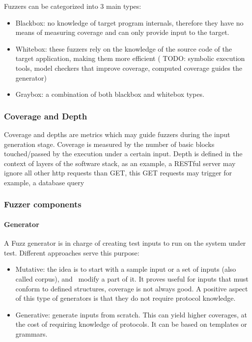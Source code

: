 Fuzzers can be categorized into 3 main types\cite{fetzer20}:

\begin{itemize}
    \item Blackbox: no knowledge of target program internals, therefore they have no means of measuring coverage and can only provide input to the target.
    \item Whitebox: these fuzzers rely on the knowledge of the source code of the target application, making them more efficient ( TODO: symbolic execution tools, model checkers that improve coverage, computed coverage guides the generator)
    \item Graybox: a combination of both blackbox and whitebox types.
\end{itemize}


\subsubsection{Coverage and Depth}

Coverage and depths are metrics which may guide fuzzers during the input generation stage.
Coverage is measured by the number of basic blocks touched/passed by the execution under a certain input.
Depth is defined in the context of layers of the software stack, as an example, a RESTful server may 
ignore all other http requests than GET, this GET requests may trigger for example, a database query \cite{fetzer20}

\subsubsection{Fuzzer components}

\paragraph{Generator}

A Fuzz generator is in charge of creating test inputs to run on the system under test. Different 
approaches serve this purpose\cite{mcnally12}:

\begin{itemize}
    \item Mutative: the idea is to start with a sample input or a set of inputs (also called corpus), and \
    modify a part of it. It proves useful for inputs that must conform to defined structures, coverage is not
    always good. A positive aspect of this type of generators is that they do not require protocol knowledge.
    \item Generative: generate inputs from scratch. This can yield higher coverages, at the cost of requiring
    knowledge of protocols. It can be based on templates or grammars.
\end{itemize}

